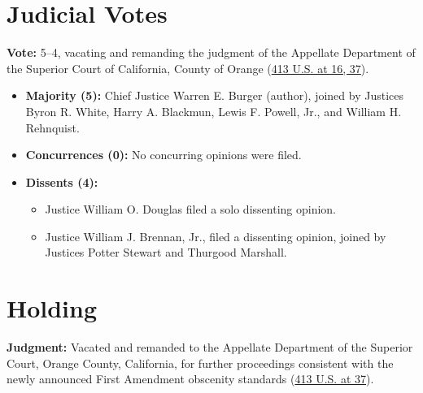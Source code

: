 \documentclass[12pt]{article}
\begin{document}
\section{Judicial Votes}
\textbf{Vote:} 5--4, vacating and remanding the judgment of the Appellate Department of the Superior Court of California, County of Orange (\href{https://supreme.justia.com/cases/federal/us/413/15/}{413 U.S. at 16, 37}).
\begin{itemize}
\item \textbf{Majority (5):} Chief Justice Warren E. Burger (author), joined by Justices Byron R. White, Harry A. Blackmun, Lewis F. Powell, Jr., and William H. Rehnquist.
\item \textbf{Concurrences (0):} No concurring opinions were filed.
\item \textbf{Dissents (4):}
\begin{itemize}
\item Justice William O. Douglas filed a solo dissenting opinion.
\item Justice William J. Brennan, Jr., filed a dissenting opinion, joined by Justices Potter Stewart and Thurgood Marshall.
\end{itemize}
\end{itemize}

\section{Holding}
\textbf{Judgment:} Vacated and remanded to the Appellate Department of the Superior Court, Orange County, California, for further proceedings consistent with the newly announced First Amendment obscenity standards (\href{https://supreme.justia.com/cases/federal/us/413/15/}{413 U.S. at 37}).
\end{document}
